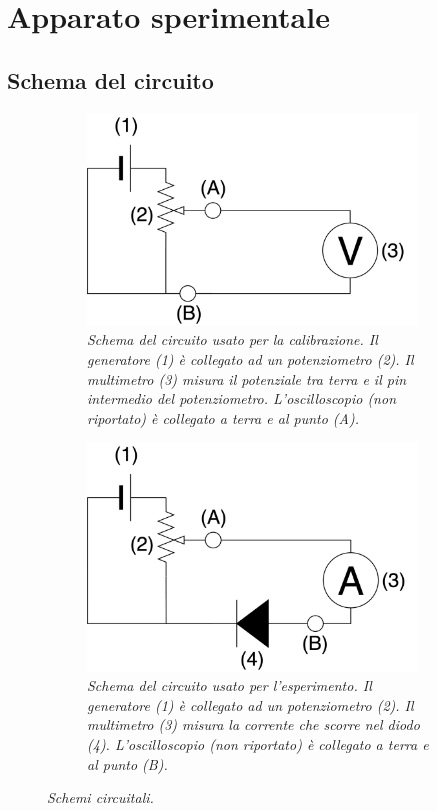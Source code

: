 \documentclass[11pt, a4paper, twoside]{article}
\begin{document}
\section{Apparato sperimentale}\label{sec:apparato-sperimentale}
  \subsection{Schema del circuito}\label{subsec:schema-circuito}
    \begin{figure}[H]
      \centering
      \begin{subfigure}[t]{.47\textwidth}
        \includegraphics[width=8.75cm]{./assets/1/circuito-calibrazione.png}
        \caption{
          \emph{
            Schema del circuito usato per la calibrazione. Il generatore (1) è collegato ad un potenziometro (2).
            Il multimetro (3) misura il potenziale tra terra e il pin intermedio del potenziometro.
            L'oscilloscopio (non riportato) è collegato a terra e al punto (A).
          }
        }
        \label{fig:circuito-calibrazione}
      \end{subfigure}
      \hspace{5mm}
      \begin{subfigure}[t]{.47\textwidth}
        \includegraphics[width=8.75cm]{./assets/1/circuito.png}
        \caption{
          \emph{
            Schema del circuito usato per l'esperimento. Il generatore (1) è collegato ad un potenziometro (2).
            Il multimetro (3) misura la corrente che scorre nel diodo (4). L'oscilloscopio (non riportato) è
            collegato a terra e al punto (B).
          }
        }
        \label{fig:circuito-prova}
      \end{subfigure}
      \caption{\emph{Schemi circuitali.}}
      \label{fig:circuiti}
    \end{figure}
\end{document}
